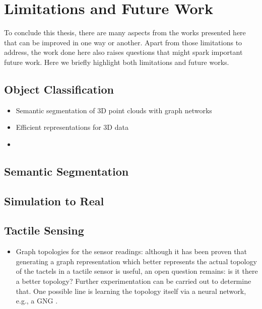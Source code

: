 \section{Limitations and Future Work}
\label{cha:conclusion:sec:future}

To conclude this thesis, there are many aspects from the works presented here that can be improved in one way or another. Apart from those limitations to address, the work done here also raises questions that might spark important future work. Here we briefly highlight both limitations and future works.

\subsection{Object Classification}

\begin{itemize}
    \item Semantic segmentation of \ac{3D} point clouds with graph networks
    \item Efficient representations for \acs{3D} data
    \item 
\end{itemize}

\subsection{Semantic Segmentation}

\subsection{Simulation to Real}

\subsection{Tactile Sensing}

\begin{itemize}
    \item Graph topologies for the sensor readings: although it has been proven that generating a graph representation which better represents the actual topology of the tactels in a tactile sensor is useful, an open question remains: is it there a better topology? Further experimentation can be carried out to determine that. One possible line is learning the topology itself via a neural network, e.g., a \ac{GNG} \cite{Fritzke1999}.
\end{itemize}